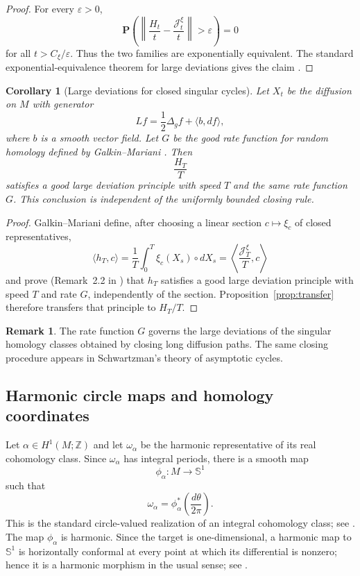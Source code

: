 \documentclass[a4paper,reqno]{amsart}
\newcommand{\Z}{\mathbb Z}
\newcommand{\Sph}{\mathbb S}
\newtheorem{corollary}[theorem]{Corollary}
\theoremstyle{definition}
\newtheorem{remark}[theorem]{Remark}
\begin{document}
\begin{proof}
For every $\varepsilon>0$,
\[
 \mathbf P\!\left(
 \left\|\frac{H_t}{t}-\frac{\mathcal J_t^\xi}{t}\right\|>\varepsilon
 \right)=0
\]
for all $t>C_\xi/\varepsilon$.  Thus the two families are exponentially equivalent.  
The standard exponential-equivalence theorem for large 
deviations gives the claim \cite[Theorem~4.2.13]{DemboZeitouni}.
\end{proof}

\begin{corollary}[Large deviations for closed singular cycles]\label{cor:GM-LDP}
Let $X_t$ be the diffusion on $M$ with generator
\[
   Lf=\frac12\Delta_g f+\langle b,df\rangle,
\]
where $b$ is a smooth vector field.  Let $G$ be the good rate function for
random homology defined by Galkin--Mariani \cite{GalkinMariani}.  Then
\[
   \frac{H_T}{T}
\]
satisfies a good large deviation principle with speed $T$ and the same rate function
$G$.  This conclusion is independent of the uniformly bounded closing rule.
\end{corollary}

\begin{proof}
Galkin--Mariani define, after choosing a linear section
$c\mapsto\xi_c$ of closed representatives,
\[
   \langle h_T,c\rangle
   =\frac1T\int_0^T\xi_c(X_s)\circ dX_s
   =\left\langle\frac{\mathcal J_T^\xi}{T},c\right\rangle
\]
and prove (Remark~2.2 in \cite{GalkinMariani}) that $h_T$ satisfies a good large deviation principle with speed
$T$ and rate $G$, independently of the section.  Proposition~\ref{prop:transfer}
therefore transfers that principle to $H_T/T$.
\end{proof}

\begin{remark}
The rate function $G$ governs the large deviations of the singular homology classes obtained by closing long diffusion paths.  The same closing procedure appears in Schwartzman's theory of asymptotic cycles.
\end{remark}


\subsection{Harmonic circle maps and homology coordinates}

Let $\alpha\in H^1(M;\Z)$ and let $\omega_\alpha$ be the harmonic representative of its real cohomology class.  Since $\omega_\alpha$ has integral periods, there is a smooth map
\[
   \phi_\alpha:M\longrightarrow \Sph^1
\]
such that
\[
   \omega_\alpha=\phi_\alpha^*\!\left(\frac{d\theta}{2\pi}\right).
\]
This is the standard circle-valued realization of an integral cohomology class; see \cite{BairdWood}.  The map $\phi_\alpha$ is harmonic.  Since the target is one-dimensional, a harmonic map to $\Sph^1$ is horizontally conformal at every point at which its differential is nonzero; hence it is a harmonic morphism in the usual sense; see \cite{BairdWood}.
\end{document}
